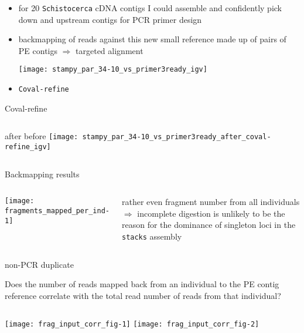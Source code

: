 \documentclass[xcolor=pdftex, dvipsnames, table]{beamer}
\begin{document}
\begin{frame}
\footnotesize
\begin{itemize}
\item for 20 \texttt{Schistocerca} cDNA contigs I could assemble and confidently pick down and upstream contigs for PCR primer design \pause
\item backmapping of reads against this new small reference made up of pairs of PE contigs $\Rightarrow$ \textrm{targeted alignment} \pause
\begin{center}
\texttt{[image: stampy\_par\_34-10\_vs\_primer3ready\_igv]}
\end{center} 
\pause
\item \texttt{Coval-refine}
\end{itemize}
\end{frame}

\begin{frame}{Coval-refine}
\begin{columns}
after
\vskip50pt
before
\texttt{[image: stampy\_par\_34-10\_vs\_primer3ready\_after\_coval-refine\_igv]}
\end{columns}
\end{frame}

\begin{frame}{Backmapping results}
\begin{columns}
\begin{center}
\texttt{[image: fragments\_mapped\_per\_ind-1]}
\end{center}
\pause
{}
rather even fragment number from all individuals \\
$\Rightarrow$ incomplete digestion is unlikely to be the reason for the dominance of singleton loci in the \texttt{stacks} assembly
\end{columns}
\begin{description}
\vskip15pt
\centering
\scriptsize
\item [fragment] non-PCR duplicate
\end{description}
\end{frame}


\begin{frame}
\centering
\footnotesize
Does the number of reads mapped back from an individual to the PE contig reference correlate with the total read number of reads from that individual?
\vskip20pt
\begin{columns}
\texttt{[image: frag\_input\_corr\_fig-1]}
\texttt{[image: frag\_input\_corr\_fig-2]}
\end{columns}
\vskip20pt
\end{frame}
\end{document}
